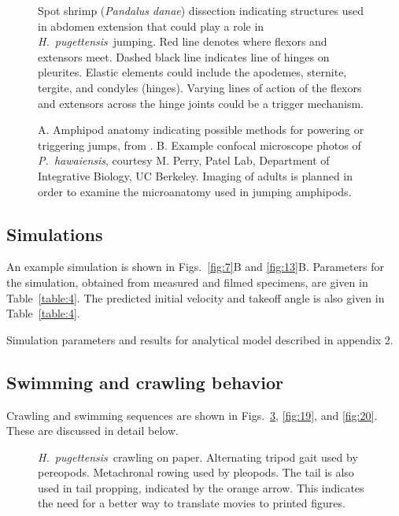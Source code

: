 \documentclass{article}
\newcommand{\Genus}[1]{\emph{#1}}
\newcommand{\Hyale}{\Genus{H.~pugettensis}}
\newcommand{\Parhyale}{\Genus{P.~hawaiensis}}
\begin{document}
\begin{figure}
\caption{Spot shrimp (\Genus{Pandalus danae}) dissection indicating structures used in abdomen extension that could play a role in \Hyale\ jumping. Red line denotes where flexors and extensors meet.  Dashed black line indicates line of hinges on pleurites.  Elastic elements could include the apodemes, sternite, tergite, and condyles (hinges). Varying lines of action of the flexors and extensors across the hinge joints could be a trigger mechanism.}
\label{fig:15}
\end{figure}

\begin{figure}
\caption{A.  Amphipod anatomy indicating possible methods for powering or triggering jumps, from \citep{Schmitz:1991}.  B.  Example confocal microscope photos of \Parhyale, courtesy M. Perry, Patel Lab, Department of Integrative Biology, UC Berkeley.  Imaging of adults is planned in order to examine the microanatomy used in jumping amphipods.}
\label{fig:16}
\end{figure}

\subsection*{Simulations}
	An example simulation is shown in Figs.~\ref{fig:7}B and \ref{fig:13}B.  Parameters for the simulation, obtained from measured and filmed specimens, are given in Table~\ref{table:4}.  The predicted initial velocity and takeoff angle is also given in Table~\ref{table:4}.  
	
\begin{table}
\caption{Simulation parameters and results for analytical model described in appendix 2.}
\label{table:4}
\end{table}

\subsection*{Swimming and crawling behavior}
	Crawling and swimming sequences are shown in Figs.~\ref{fig:18}, \ref{fig:19}, and \ref{fig:20}.  These are discussed in detail below. 
	
\begin{figure}
\caption{\Hyale\ crawling on paper.  Alternating tripod gait used by pereopods.  Metachronal rowing used by pleopods.  The tail is also used in tail propping, indicated by the orange arrow.  This indicates the need for a better way to translate movies to printed figures.}
\label{fig:18}
\end{figure}
\end{document}

